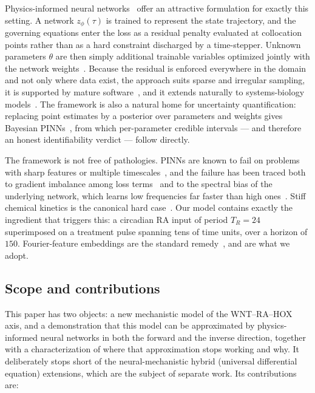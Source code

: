 \documentclass[11pt]{article}
\begin{document}
Physics-informed neural networks~\citep{raissi2019pinn,karniadakis2021piml}
offer an attractive formulation for exactly this setting. A network
$z_\phi(\tau)$ is trained to represent the state trajectory, and the governing
equations enter the loss as a residual penalty evaluated at collocation points
rather than as a hard constraint discharged by a time-stepper. Unknown
parameters $\theta$ are then simply additional trainable variables optimized
jointly with the network weights~\citep{raissi2019pinn}. Because the residual
is enforced everywhere in the domain and not only where data exist, the
approach suits sparse and irregular sampling, it is supported by mature
software~\citep{lu2021deepxde}, and it extends naturally to systems-biology
models~\citep{yazdani2020systems,daneker2023identifiability}. The
framework is also a natural home for uncertainty quantification: replacing
point estimates by a posterior over parameters and weights gives Bayesian
PINNs~\citep{yang2021bpinns}, from which per-parameter credible intervals ---
and therefore an honest identifiability verdict --- follow directly.

The framework is not free of pathologies. PINNs are known to fail on problems
with sharp features or multiple timescales~\citep{krishnapriyan2021failure},
and the failure has been traced both to gradient imbalance among loss
terms~\citep{wang2021gradient} and to the spectral bias of the underlying
network, which learns low frequencies far faster than high
ones~\citep{rahaman2019spectral,wang2022ntk}. Stiff chemical kinetics is the
canonical hard case~\citep{ji2021stiffpinn}. Our model contains exactly the
ingredient that triggers this: a circadian RA input of period $T_R=24$
superimposed on a treatment pulse spanning tens of time units, over a horizon
of $150$. Fourier-feature embeddings are the standard
remedy~\citep{tancik2020fourier}, and are what we adopt.

\subsection{Scope and contributions}

This paper has two objects: a new mechanistic model of the WNT--RA--HOX axis,
and a demonstration that this model can be approximated by physics-informed
neural networks in both the forward and the inverse direction, together with a
characterization of where that approximation stops working and why. It
deliberately stops short of the neural-mechanistic hybrid (universal
differential equation) extensions, which are the subject of separate work. Its
contributions are:
\end{document}
